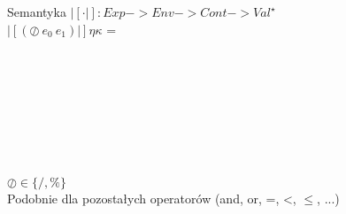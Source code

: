 \documentclass[12pt,serif]{beamer}
\begin{document}
\begin{frame}{Semantyka}
$|[ \cdot |]: Exp -> Env -> Cont -> Val^{\star}$ \newline
\\
$|[(\oslash~e_0~e_1)|] \eta \kappa$ = \\
\hspace{1em}{$|[e_0|]$ $\eta$ ($\lambda$ <$\eta_0, n_0$> .} \\
\hspace{2em}{$|[e_1|]$ $\eta$ ($\lambda$ <$\eta_1, n_1$> .} \\
\hspace{3em}{cond($n_1=0$,} \\
\hspace{5.5em}{<err,"div. by 0">,} \\
 \\
\hspace{3em}{)} \\
 \\
 \newline
\\
$\oslash \in \{/,\%\}$ \newline
\\
\pause
Podobnie dla pozostałych operatorów (and, or, =, <, $\leq$, ...)
\end{frame}
\end{document}
